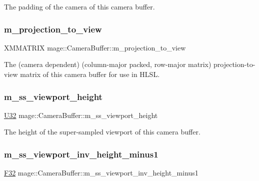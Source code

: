 The padding of the camera of this camera buffer. \hypertarget{structmage_1_1_camera_buffer_ad64e571c4fd9595c2fcd40bfd602e024}{}\label{structmage_1_1_camera_buffer_ad64e571c4fd9595c2fcd40bfd602e024} 
\subsubsection{\texorpdfstring{m\+\_\+projection\+\_\+to\+\_\+view}{m\_projection\_to\_view}}
{\footnotesize\ttfamily X\+M\+M\+A\+T\+R\+IX mage\+::\+Camera\+Buffer\+::m\+\_\+projection\+\_\+to\+\_\+view}

The (camera dependent) (column-\/major packed, row-\/major matrix) projection-\/to-\/view matrix of this camera buffer for use in H\+L\+SL. \hypertarget{structmage_1_1_camera_buffer_a6bbc5a57e9f456518afacf0a0e5633ed}{}\label{structmage_1_1_camera_buffer_a6bbc5a57e9f456518afacf0a0e5633ed} 
\subsubsection{\texorpdfstring{m\+\_\+ss\+\_\+viewport\+\_\+height}{m\_ss\_viewport\_height}}
{\footnotesize\ttfamily \hyperlink{namespacemage_a41c104c036fba3756a74e19f793eeaa1}{U32} mage\+::\+Camera\+Buffer\+::m\+\_\+ss\+\_\+viewport\+\_\+height}

The height of the super-\/sampled viewport of this camera buffer. \hypertarget{structmage_1_1_camera_buffer_a62f3a9c95c3e3cecfc1744de82ac2ca2}{}\label{structmage_1_1_camera_buffer_a62f3a9c95c3e3cecfc1744de82ac2ca2} 
\subsubsection{\texorpdfstring{m\+\_\+ss\+\_\+viewport\+\_\+inv\+\_\+height\+\_\+minus1}{m\_ss\_viewport\_inv\_height\_minus1}}
{\footnotesize\ttfamily \hyperlink{namespacemage_aa97e833b45f06d60a0a9c4fc22ae02c0}{F32} mage\+::\+Camera\+Buffer\+::m\+\_\+ss\+\_\+viewport\+\_\+inv\+\_\+height\+\_\+minus1}

